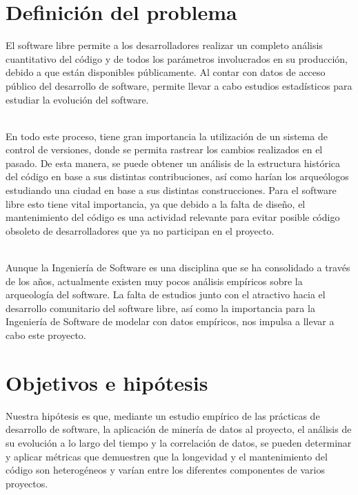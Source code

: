 \documentclass[a4paper, 12pt]{book}
\begin{document}
\section{Definición del problema}
\label{sec:definición del problema}

El software libre permite a los desarrolladores realizar un completo análisis cuantitativo del
código y de todos los parámetros involucrados en su producción, debido a que están disponibles públicamente.
Al contar con datos de acceso público del desarrollo de software, permite llevar a cabo estudios estadísticos
para estudiar la evolución del software.

\\En todo este proceso, tiene gran importancia la utilización de un sistema de control de versiones, donde se permita
rastrear los cambios realizados en el pasado. De esta manera, se puede obtener un análisis de la estructura histórica
del código en base a sus distintas contribuciones, así como harían los arqueólogos estudiando una ciudad en base a sus
distintas construcciones.
Para el software libre esto tiene vital importancia, ya que debido a la falta de diseño, el mantenimiento del código
es una actividad relevante para evitar posible código obsoleto de desarrolladores que ya no participan en el proyecto.

\\Aunque la Ingeniería de Software es una disciplina que se ha consolidado a través de los años, actualmente
existen muy pocos análisis empíricos sobre la arqueología del software. La falta de estudios junto con el atractivo hacia el
desarrollo comunitario del software libre, así como la importancia para la Ingeniería de Software de modelar con datos empíricos,
nos impulsa a llevar a cabo este proyecto.

\section{Objetivos e hipótesis}
\label{sec:objetivos}

Nuestra hipótesis es que, mediante un estudio empírico de las prácticas de desarrollo de software, la aplicación de minería de datos
al proyecto, el análisis de su evolución a lo largo del tiempo y la correlación de datos, se pueden determinar y aplicar métricas
que demuestren que la longevidad y el mantenimiento del código son heterogéneos y varían entre los diferentes componentes de varios proyectos.
\end{document}
